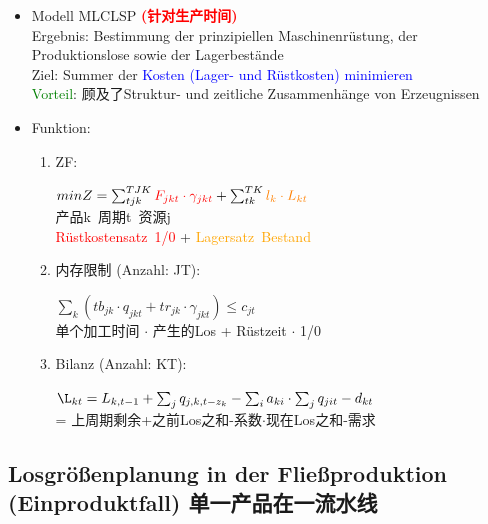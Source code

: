 \documentclass[12pt, letterpaper]{article}
\begin{document}
\begin{CJK*}{UTF8}{gbsn}
\begin{itemize}
\item Modell MLCLSP \textbf{\textcolor{red}{(针对生产时间)}}\\
Ergebnis: Bestimmung der prinzipiellen Maschinenrüstung, der Produktionslose sowie der Lagerbestände\\
Ziel: Summer der \textcolor{blue}{Kosten (Lager- und Rüstkosten) minimieren}\\[1mm]
\textcolor{green}{Vorteil}: 顾及了Struktur- und zeitliche Zusammenhänge von Erzeugnissen


\item Funktion:\\

\begin{enumerate}


\item ZF:
\begin{center}
$min Z = \sum_{tjk}^{TJK} \textcolor{red}{F_{jkt} \cdot \gamma_{jkt}}
 +\sum_{tk}^{TK} \textcolor{orange}{ l_k \cdot L_{kt}}$\\
 产品k\ 周期t\ 资源j\\
\textcolor{red}{Rüstkostensatz\ 1/0} + \textcolor{orange}{Lagersatz\ Bestand}
\end{center}

\item 内存限制 (Anzahl: JT):
\begin{center}
$\sum_k (tb_{jk} \cdot q_{jkt} + tr_{jk} \cdot \gamma_{jkt}) \leq c_{jt}$\\
 单个加工时间 $\cdot$ 产生的Los + Rüstzeit $\cdot$ 1/0\\
 \end{center}
 
 \item Bilanz (Anzahl: KT):
\begin{center}
$\L_{kt} = L_{k,t-1} + \sum_j q_{j,k,t-z_k}
- \sum_i a_{ki} \cdot \sum_j q_{jit} - d_{kt}$\\
 = 上周期剩余+之前Los之和-系数$\cdot$现在Los之和-需求\\
 \end{center}


\end{enumerate}
\end{itemize}

\newpage
\subsection{Losgrößenplanung in der Fließproduktion (Einproduktfall) 单一产品在一流水线}



\end{CJK*}
\end{document}
